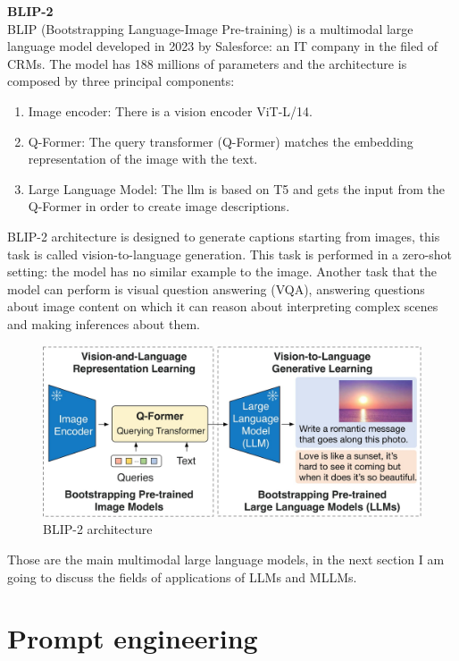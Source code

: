 \textbf{BLIP-2}\\
BLIP (Bootstrapping Language-Image Pre-training) is a multimodal large language model developed in 2023 by Salesforce: an IT company in the filed of CRMs.
The model has 188 millions of parameters and the architecture is composed by three principal components:
\begin{enumerate}
    \item Image encoder: There is a vision encoder ViT-L/14.

    \item Q-Former: The query transformer (Q-Former) matches the embedding representation of the image with the text.

    \item Large Language Model: The llm is based on T5 and gets the input from the Q-Former in order to create image descriptions.
\end{enumerate}
BLIP-2 architecture is designed to generate captions starting from images, this task is called vision-to-language generation. This task is performed in a zero-shot setting: the model has no similar example to the image. Another task that the model can perform is visual question answering (VQA), answering questions about image content on which it can reason about interpreting complex scenes and making inferences about them. 
\begin{figure}[H]
    \centering
    \includegraphics[width=0.7\linewidth]{Figures/fig_24.jpg}
    \caption{BLIP-2 architecture}
    \label{fig:enter-label}
\end{figure}
Those are the main multimodal large language models, in the next section I am going to discuss the fields of applications of LLMs and MLLMs.


\newpage
\section{Prompt engineering}
